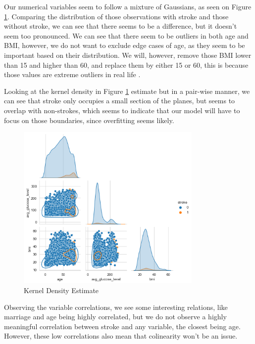 \documentclass[11pt, a4paper]{article}
\begin{document}
Our numerical variables seem to follow a mixture of Gaussians, as seen on Figure \ref{fig:KDE}. Comparing the distribution of those observations with stroke and those without stroke, we can see that there seems to be a difference, but it doesn't seem too pronounced. We can see that there seem to be outliers in both age and BMI, however, we do not want to exclude edge cases of age, as they seem to be important based on their distribution. We will, however, remove those BMI lower than 15 and higher than 60, and replace them by either 15 or 60, this is because those values are extreme outliers in real life \cite{BMI}.

Looking at the kernel density in Figure \ref{fig:KDE} estimate but in a pair-wise manner, we can see that stroke only occupies a small section of the planes, but seems to overlap with non-strokes, which seems to indicate that our model will have to focus on those boundaries, since overfitting seems likely.

\begin{figure}[H]
    \centering
    \includegraphics[width=0.8\textwidth]{images/KDE.png}
    \caption{Kernel Density Estimate}
    \label{fig:KDE}
\end{figure}

Observing the variable correlations, we see some interesting relations, like marriage and age being highly correlated, but we do not observe a highly meaningful correlation between stroke and any variable, the closest being age. However, these low correlations also mean that colinearity won't be an issue.
\end{document}
